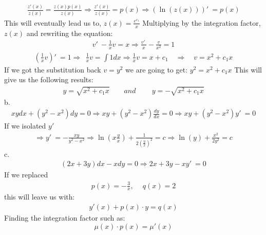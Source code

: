 \begin{enumerate}
  \begin{align}
      \frac{z'\left(x\right)}{z\left(x\right)}=\frac{z\left(x\right)p\left(x\right)}{
  z\left(x\right)} \Rightarrow \frac{
  z'\left(x\right)}{z\left(x\right)}=p\left(x\right) 
  \Rightarrow 
  \left(\ln \left(z\left(x\right)\right)\right)'\:=p\left(x\right)
  \end{align}
  This will eventually lead us to, $z\left(x\right)=\frac{e^{c_1}}{x}$
  Multiplying by the integration factor, $z(x)$ and rewriting the equation:
  \begin{align}
      v'\:-\frac{1}{x}v=x 
  \Rightarrow 
  \frac{v'\:}{x}-\frac{v}{x^2}=1
  \end{align}
  \begin{align}
      \left(\frac{1}{x}v\right)'\:=1  \Rightarrow  \ \ \frac{1}{x}v=\int 1dx \Rightarrow 
  \frac{1}{x}v=x+c_1 \quad
  \Rightarrow \quad
  v=x^2+c_1x
  \end{align}
  If we got the substitution back $v=y^2$ we are going to get: $y^2=x^2+c_1x$
  This will give us the following results:
  \begin{align}
      y=\sqrt{x^2+c_1x}\qquad and \qquad \:y=-\sqrt{x^2+c_1x}
  \end{align}
  b. 
  \begin{align}
      xydx+\left(y^2-x^2\right)dy=0 \Longrightarrow 
  xy+\left(y^2-x^2\right)\frac{dy}{dx}=0
  \Longrightarrow 
  xy+\left(y^2-x^2\right)y'\:=0 
  \end{align}
  If we isolated $y'$
  \begin{align}
      \Longrightarrow 
  y'\:=-\frac{xy}{y^2-x^2}
  \Longrightarrow 
  \ln \left(x\frac{y}{x}\right)+\frac{1}{2\left(\frac{y}{x}\right)^2}=c
  \Longrightarrow 
  \ln \left(y\right)+\frac{x^2}{2y^2}=c
  \end{align}
  c.
  \begin{align}
      \left(2x+3y\right)dx-xdy=0
  \Longrightarrow 
  2x+3y-xy'\:=0
  \end{align}
  If we replaced
  \begin{align}
      p\left(x\right)=-\frac{3}{x},\:\quad q\left(x\right)=2 
  \end{align}
  this will leave us with:
  \begin{align}
      y'\left(x\right)+p\left(x\right)\cdot y=q\left(x\right)
  \end{align}
  Finding the integration factor such as: 
  \begin{equation}
      \mu \left(x\right)\cdot p\left(x\right)=\mu '\left(x\right)
  \end{equation}

\end{enumerate}
